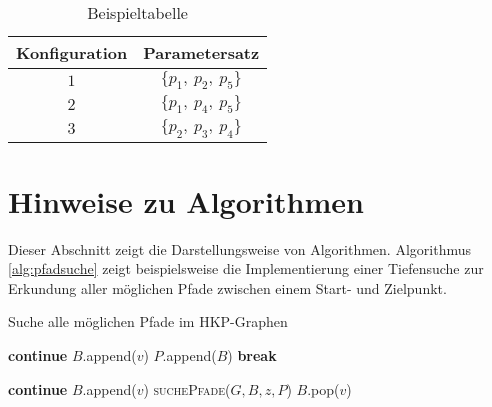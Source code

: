 \begin{table}[htbp]
  \caption{Beispieltabelle}
  \renewcommand{\arraystretch}{1.3}
  \centering
  \begin{tabular}{cc}
	\toprule
    Konfiguration & Parametersatz \\
    \midrule
    $1$ & $\{p_{1}, \: p_{2}, \: p_{5}\}$ \\
    $2$ & $\{p_{1}, \: p_{4}, \: p_{5}\}$ \\
    $3$ & $\{p_{2}, \: p_{3}, \: p_{4}\}$ \\
    \bottomrule
    \end{tabular}
  \label{tab:bsp1}
\end{table}


\section{Hinweise zu Algorithmen}
\label{hinweise:algorithmen}

Dieser Abschnitt zeigt die Darstellungsweise von Algorithmen.
Algorithmus \ref{alg:pfadsuche} zeigt beispielsweise die Implementierung einer Tiefensuche zur Erkundung aller möglichen Pfade zwischen einem Start- und Zielpunkt. 

\begin{algorithm}
  \caption{Suche alle möglichen Pfade im HKP-Graphen}
    \label{alg:pfadsuche}
  \begin{algorithmic}[1]
    \Statex
       
        
        \State \textbf{continue}
       \EndIf
        
        \State $B$.append($v$) 
        \State $P$.append($B$) 
        \State \textbf{break}
       \EndIf
      \EndFor
      
        
        \State \textbf{continue}        
       \EndIf
       \State $B$.append($v$) 
       \State \textsc{suchePfade}($G,B,z,P$) 
       \State $B$.pop($v$)
      \EndFor
    \EndFunction
  \end{algorithmic}
\end{algorithm}


